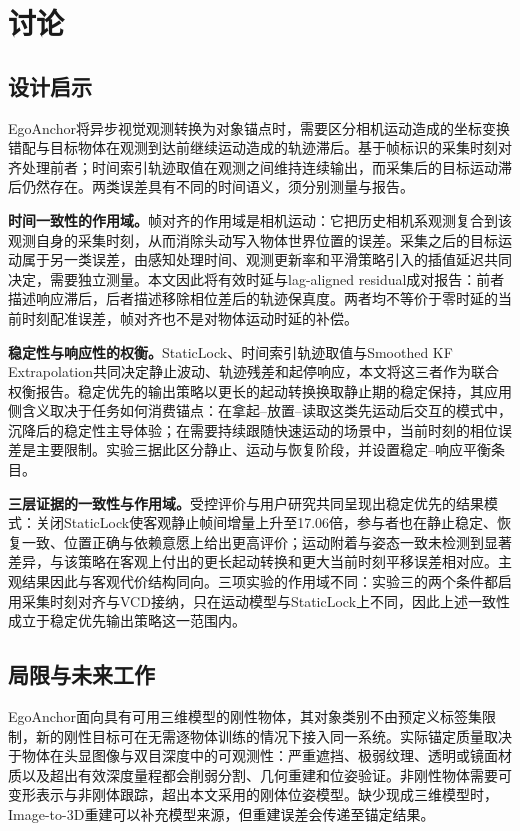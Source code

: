 \documentclass[review]{vgtc}
\begin{document}


\section{讨论}\label{sec:discussion}

\subsection{设计启示}

EgoAnchor将异步视觉观测转换为对象锚点时，需要区分相机运动造成的坐标变换错配与目标物体在观测到达前继续运动造成的轨迹滞后。基于帧标识的采集时刻对齐处理前者；时间索引轨迹取值在观测之间维持连续输出，而采集后的目标运动滞后仍然存在。两类误差具有不同的时间语义，须分别测量与报告。

\textbf{时间一致性的作用域。}帧对齐的作用域是相机运动：它把历史相机系观测复合到该观测自身的采集时刻，从而消除头动写入物体世界位置的误差。采集之后的目标运动属于另一类误差，由感知处理时间、观测更新率和平滑策略引入的插值延迟共同决定，需要独立测量。本文因此将有效时延与lag-aligned residual成对报告：前者描述响应滞后，后者描述移除相位差后的轨迹保真度。两者均不等价于零时延的当前时刻配准误差，帧对齐也不是对物体运动时延的补偿。

\textbf{稳定性与响应性的权衡。}StaticLock、时间索引轨迹取值与Smoothed KF Extrapolation共同决定静止波动、轨迹残差和起停响应，本文将这三者作为联合权衡报告。稳定优先的输出策略以更长的起动转换换取静止期的稳定保持，其应用侧含义取决于任务如何消费锚点：在拿起--放置--读取这类先运动后交互的模式中，沉降后的稳定性主导体验；在需要持续跟随快速运动的场景中，当前时刻的相位误差是主要限制。实验三据此区分静止、运动与恢复阶段，并设置稳定--响应平衡条目。

\textbf{三层证据的一致性与作用域。}受控评价与用户研究共同呈现出稳定优先的结果模式：关闭StaticLock使客观静止帧间增量上升至17.06倍，参与者也在静止稳定、恢复一致、位置正确与依赖意愿上给出更高评价；运动附着与姿态一致未检测到显著差异，与该策略在客观上付出的更长起动转换和更大当前时刻平移误差相对应。主观结果因此与客观代价结构同向。三项实验的作用域不同：实验三的两个条件都启用采集时刻对齐与VCD接纳，只在运动模型与StaticLock上不同，因此上述一致性成立于稳定优先输出策略这一范围内。

\subsection{局限与未来工作}

EgoAnchor面向具有可用三维模型的刚性物体，其对象类别不由预定义标签集限制，新的刚性目标可在无需逐物体训练的情况下接入同一系统。实际锚定质量取决于物体在头显图像与双目深度中的可观测性：严重遮挡、极弱纹理、透明或镜面材质以及超出有效深度量程都会削弱分割、几何重建和位姿验证。非刚性物体需要可变形表示与非刚体跟踪，超出本文采用的刚体位姿模型。缺少现成三维模型时，Image-to-3D重建可以补充模型来源，但重建误差会传递至锚定结果。
\end{document}

